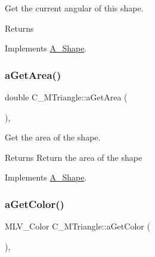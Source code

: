 Get the current angular of this shape. 

\begin{DoxyReturn}{Returns}

\end{DoxyReturn}


Implements \hyperlink{classA__Shape_a80fa4e009c875dd0ba7fc5bfeeb43f98}{A\+\_\+\+Shape}.

\mbox{\label{classC__MTriangle_a1baff5085fc1b9822987e3fc307550ce}} 
\subsubsection{\texorpdfstring{a\+Get\+Area()}{aGetArea()}}
{\footnotesize\ttfamily double C\+\_\+\+M\+Triangle\+::a\+Get\+Area (\begin{DoxyParamCaption}{ }\end{DoxyParamCaption})\hspace{0.3cm}{\ttfamily [override]}, {\ttfamily [virtual]}}



Get the area of the shape. 

\begin{DoxyReturn}{Returns}
Return the area of the shape 
\end{DoxyReturn}


Implements \hyperlink{classA__Shape_a1b142ee2d873d6c217f65de1632e7b6e}{A\+\_\+\+Shape}.

\mbox{\label{classC__MTriangle_aa567d77ce0e6d664beb6eea9268b1bc3}} 
\subsubsection{\texorpdfstring{a\+Get\+Color()}{aGetColor()}}
{\footnotesize\ttfamily M\+L\+V\+\_\+\+Color C\+\_\+\+M\+Triangle\+::a\+Get\+Color (\begin{DoxyParamCaption}{ }\end{DoxyParamCaption})\hspace{0.3cm}{\ttfamily [override]}, {\ttfamily [virtual]}}



